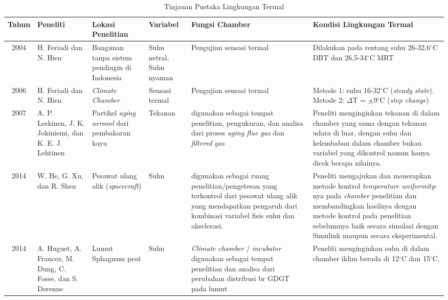 \begin{landscape}
	\begin{table}[t]
		\caption{Tinjauan Pustaka Lingkungan Termal}
		\centering
		\label{tbl:2:studichamber}
		\begin{tabular}{|c|p{2.6cm}|p{3cm}|p{2.3cm}|p{5.5cm}|p{5.5cm}|}
			\hline
			Tahun & Peneliti & Lokasi Penelitian & Variabel & Fungsi Chamber & Kondisi Lingkungan Termal \\ \hline
			
			2004 \cite{article2.1:1} & H. Feriadi dan N. Hien & Bangunan tanpa sistem pendingin di Indonesia & Suhu netral, Suhu nyaman & Pengujian sensasi termal & Dilakukan pada rentang suhu 26-32,6$^{\circ}$C DBT dan 26,5-34$^{\circ}$C MRT \\ \hline
			
			2006 \cite{article2.1:2} & H. Feriadi dan N. Hien & \textit{Climate Chamber} & Sensasi termal & Pengujian sensasi termal & Metode 1: suhu 16-32$^{\circ}$C (\textit{steady state}). Metode 2: $\Delta$T = $\pm$9$^{\circ}$C (\textit{step change}) \\ \hline
			
			2007 \cite{article2.1:4} & A. P. Leskinen, J. K. Jokiniemi, dan K. E. J. Lehtinen & Partikel \textit{aging aerosol} dari pembakaran kayu & Tekanan & digunakan sebagai tempat penelitian, pengukuran, dan analisa dari proses \textit{aging flue gas} dan \textit{filtered gas} & Peneliti menginginkan tekanan di dalam chamber yang sama dengan tekanan udara di luar, dengan suhu dan kelembaban dalam chamber bukan variabel yang dikontrol namun hanya dicek berapa nilainya. \\ \hline
			
			2014 \cite{article2.1:5} & W. He, G. Xu, dan R. Shen & Pesawat ulang alik (\textit{spacecraft}) & Suhu & digunakan sebagai ruang penelitian/pengetesan yang terkontrol dari pesawat ulang alik yang mendapatkan pengaruh dari kombinasi variabel fisis suhu dan akselerasi. & Peneliti mengajukan dan menerapkan metode kontrol \textit{temperature uniformity}-nya pada \textit{chamber} penelitian dan membandingkan hasilnya dengan metode kontrol pada penelitian sebelumnya baik secara simulasi dengan Simulink maupun secara eksperimental. \\ \hline
			
			2014 \cite{article2.1:6} & A. Huguet, A. Francez, M. Dung, C. Fosse, dan S. Derenne & Lumut Sphagnum peat & Suhu & \textit{Climate chamber} / \textit{incubator} digunakan sebagai tempat penelitian dan analisa dari perubahan distribusi br GDGT pada lumut & Peneliti menginginkan suhu di dalam chamber iklim berada di 12$^{\circ}$C dan 15$^{\circ}$C. \\ \hline
		\end{tabular}
	\end{table}
\end{landscape}

